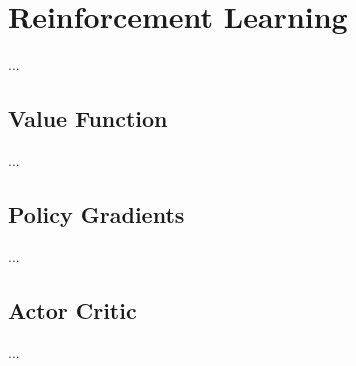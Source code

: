 \section{Reinforcement Learning}
...
\subsection{Value Function}
...
\subsection{Policy Gradients}
...
\subsection{Actor Critic}
...